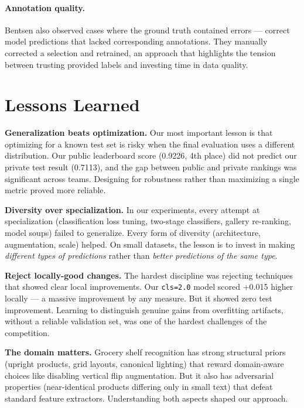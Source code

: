 \documentclass[11pt,a4paper]{article}
\begin{document}
\paragraph{Annotation quality.}
Bentsen also observed cases where the ground truth contained errors --- correct model predictions that lacked corresponding annotations.
They manually corrected a selection and retrained, an approach that highlights the tension between trusting provided labels and investing time in data quality.

\section{Lessons Learned}
\label{sec:lessons}

\textbf{Generalization beats optimization.}
Our most important lesson is that optimizing for a known test set is risky when the final evaluation uses a different distribution.
Our public leaderboard score (0.9226, 4th place) did not predict our private test result (0.7113), and the gap between public and private rankings was significant across teams.
Designing for robustness rather than maximizing a single metric proved more reliable.

\textbf{Diversity over specialization.}
In our experiments, every attempt at specialization (classification loss tuning, two-stage classifiers, gallery re-ranking, model soups) failed to generalize.
Every form of diversity (architecture, augmentation, scale) helped.
On small datasets, the lesson is to invest in making \emph{different types of predictions} rather than \emph{better predictions of the same type}.

\textbf{Reject locally-good changes.}
The hardest discipline was rejecting techniques that showed clear local improvements.
Our \texttt{cls=2.0} model scored +0.015 higher locally --- a massive improvement by any measure.
But it showed zero test improvement.
Learning to distinguish genuine gains from overfitting artifacts, without a reliable validation set, was one of the hardest challenges of the competition.

\textbf{The domain matters.}
Grocery shelf recognition has strong structural priors (upright products, grid layouts, canonical lighting) that reward domain-aware choices like disabling vertical flip augmentation.
But it also has adversarial properties (near-identical products differing only in small text) that defeat standard feature extractors.
Understanding both aspects shaped our approach.
\end{document}
